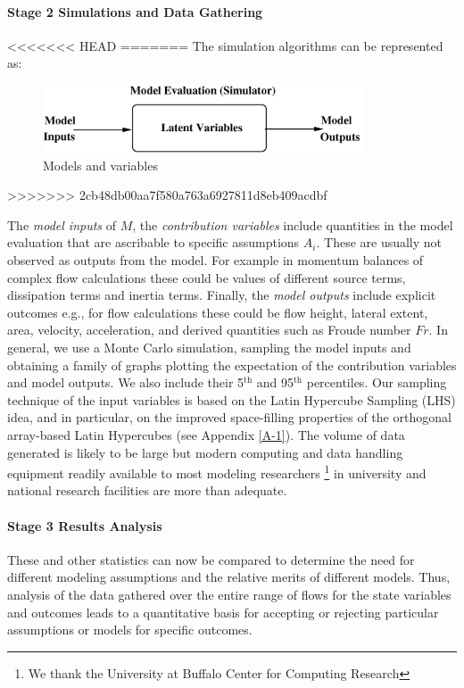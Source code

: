 \documentclass{article}
\begin{document}
\paragraph{Stage 2 Simulations and Data Gathering}
<<<<<<< HEAD
=======
The simulation algorithms can be represented as:
\begin{figure}[H]
\centerline{\includegraphics[width=0.85\textwidth]{figures/modelproc.png}}
\centering
\caption{Models and variables}
\end{figure}
>>>>>>> 2cb48db00aa7f580a763a6927811d8eb409acdbf

The \emph{model inputs}  of $M$, the \emph{contribution variables} include quantities in the model evaluation that are ascribable to specific assumptions $A_i$. These are usually not observed as outputs from the model. For example in momentum balances of complex flow calculations these could be values of different source terms, dissipation terms and inertia terms. Finally, the \emph{model outputs} include explicit outcomes e.g., for flow calculations these could be flow height, lateral extent, area, velocity, acceleration, and derived quantities such as Froude number $Fr$. In general, we use a Monte Carlo simulation, sampling the model inputs and obtaining a family of graphs plotting the expectation of the contribution variables and model outputs. We also include their 5$^{\mathrm{th}}$ and 95$^{\mathrm{th}}$ percentiles. Our sampling technique of the input variables is based on the Latin Hypercube Sampling (LHS) idea, and in particular, on the improved space-filling properties of the orthogonal array-based Latin Hypercubes (see Appendix \ref{A-1}). The volume of data generated is likely to be large but modern computing and data handling equipment readily available to most modeling researchers \footnote{We thank the University at Buffalo Center for Computing Research} in university and national research facilities are more than adequate.

\paragraph{Stage 3 Results Analysis} These and other statistics can now be compared to determine the need for different modeling assumptions and the relative merits of different models. Thus, analysis of the data gathered over the entire range of flows for the state variables and outcomes leads to a quantitative basis for accepting or rejecting particular assumptions or models for specific outcomes.
\end{document}
